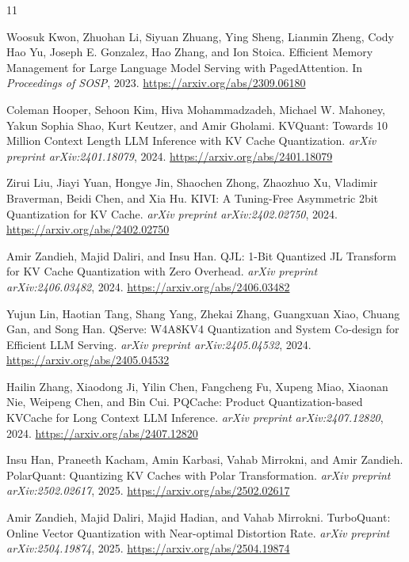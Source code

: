 \documentclass[11pt]{article}
\begin{document}
\begin{thebibliography}{11}

Woosuk Kwon, Zhuohan Li, Siyuan Zhuang, Ying Sheng, Lianmin Zheng, Cody Hao Yu, Joseph E. Gonzalez, Hao Zhang, and Ion Stoica.
\newblock Efficient Memory Management for Large Language Model Serving with PagedAttention.
\newblock In \emph{Proceedings of SOSP}, 2023. \url{https://arxiv.org/abs/2309.06180}

Coleman Hooper, Sehoon Kim, Hiva Mohammadzadeh, Michael W. Mahoney, Yakun Sophia Shao, Kurt Keutzer, and Amir Gholami.
\newblock KVQuant: Towards 10 Million Context Length LLM Inference with KV Cache Quantization.
\newblock \emph{arXiv preprint arXiv:2401.18079}, 2024. \url{https://arxiv.org/abs/2401.18079}

Zirui Liu, Jiayi Yuan, Hongye Jin, Shaochen Zhong, Zhaozhuo Xu, Vladimir Braverman, Beidi Chen, and Xia Hu.
\newblock KIVI: A Tuning-Free Asymmetric 2bit Quantization for KV Cache.
\newblock \emph{arXiv preprint arXiv:2402.02750}, 2024. \url{https://arxiv.org/abs/2402.02750}

Amir Zandieh, Majid Daliri, and Insu Han.
\newblock QJL: 1-Bit Quantized JL Transform for KV Cache Quantization with Zero Overhead.
\newblock \emph{arXiv preprint arXiv:2406.03482}, 2024. \url{https://arxiv.org/abs/2406.03482}

Yujun Lin, Haotian Tang, Shang Yang, Zhekai Zhang, Guangxuan Xiao, Chuang Gan, and Song Han.
\newblock QServe: W4A8KV4 Quantization and System Co-design for Efficient LLM Serving.
\newblock \emph{arXiv preprint arXiv:2405.04532}, 2024. \url{https://arxiv.org/abs/2405.04532}

Hailin Zhang, Xiaodong Ji, Yilin Chen, Fangcheng Fu, Xupeng Miao, Xiaonan Nie, Weipeng Chen, and Bin Cui.
\newblock PQCache: Product Quantization-based KVCache for Long Context LLM Inference.
\newblock \emph{arXiv preprint arXiv:2407.12820}, 2024. \url{https://arxiv.org/abs/2407.12820}

Insu Han, Praneeth Kacham, Amin Karbasi, Vahab Mirrokni, and Amir Zandieh.
\newblock PolarQuant: Quantizing KV Caches with Polar Transformation.
\newblock \emph{arXiv preprint arXiv:2502.02617}, 2025. \url{https://arxiv.org/abs/2502.02617}

Amir Zandieh, Majid Daliri, Majid Hadian, and Vahab Mirrokni.
\newblock TurboQuant: Online Vector Quantization with Near-optimal Distortion Rate.
\newblock \emph{arXiv preprint arXiv:2504.19874}, 2025. \url{https://arxiv.org/abs/2504.19874}


\end{thebibliography}
\end{document}

